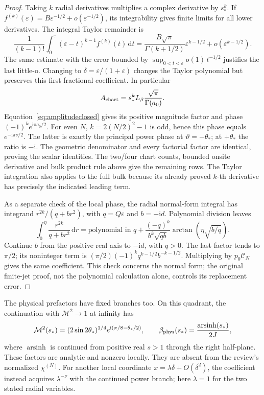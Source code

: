 \documentclass[11pt]{article}
\numberwithin{equation}{section}
\theoremstyle{definition}
\newcommand{\dd}{\,\mathrm d}
\newcommand{\ii}{\mathrm i}
\newcommand{\eps}{\varepsilon}
\newcommand{\M}{\mathcal M}
\begin{document}
\begin{proof}
Taking \(k\) radial derivatives multiplies a complex derivative by
\(s_*^k\). If \(f^{(k)}(\eps)=B\eps^{-1/2}+o(\eps^{-1/2})\),
its integrability gives finite limits for all lower derivatives.
The integral Taylor remainder is
\[
 \frac1{(k-1)!}\int_0^\eps(\eps-t)^{k-1}f^{(k)}(t)\dd t
 =\frac{B\sqrt\pi}{\Gamma(k+1/2)}\eps^{k-1/2}
       +o(\eps^{k-1/2}).
\]
The same estimate with the error bounded by
\(\sup_{0<t<\eps}o(1)\,t^{-1/2}\) justifies the last little-o.
Changing to \(\delta=\eps/(1+\eps)\) changes the Taylor polynomial
but preserves this first fractional coefficient. In particular
\[
 A_{\rm chart}=s_*^kL_\beta\frac{\sqrt\pi}{\Gamma(a_0)}.
\]
Equation~\eqref{eq:amplitudeclosed} gives its positive magnitude
factor and phase \((-1)^ke^{\ii\pi a_0/2}\).
For even \(N\), \(k=2(N/2)^2-1\) is odd, hence this phase equals
\(e^{-\ii\pi\nu/2}\). The latter is exactly the principal power
phase at \(\vartheta=-\theta_*\); at \(+\theta_*\) the ratio is
\(-\ii\). The geometric denominator and every factorial factor
are identical, proving the scalar identities.
The two/four chart counts, bounded onsite derivative and bulk
product rule above give the remaining rows. The Taylor integration
also applies to the full bulk because its already proved \(k\)-th
derivative has precisely the indicated leading term.

As a separate check of the local phase, the radial normal-form
integral has integrand \(r^{2k}/(q+b r^2)\), with \(q=Q\eps\)
and \(b=-\ii d\). Polynomial division leaves
\[
 \int_0^\eta\frac{r^{2k}}{q+b r^2}\dd r
 =\text{polynomial in }q+
 \frac{(-q)^k}{b^k\sqrt{qb}}
             \arctan\!\left(\eta\sqrt{b/q}\right).
\]
Continue \(b\) from the positive real axis to \(-\ii d\), with
\(q>0\). The last factor tends to \(\pi/2\); its noninteger term
is \((\pi/2)(-1)^kq^{k-1/2}b^{-k-1/2}\).
Multiplying by \(p_0\mathscr C_N\) gives the same coefficient.
This check concerns the normal form; the original finite-jet proof,
not the polynomial calculation alone, controls its replacement error.
\end{proof}

The physical prefactors have fixed branches too. On this quadrant,
the continuation with \(\M^2\to1\) at infinity has
\[
 \M^2(s_*)=(2\sin2\theta_*)^{1/4}
             e^{\ii(\pi/8-\theta_*/2)},\qquad
 \beta_{\rm phys}(s_*)=\frac{\operatorname{arsinh}(s_*)}{2J},
\]
where \(\operatorname{arsinh}\) is continued from positive real
\(s>1\) through the right half-plane. These factors are analytic
and nonzero locally. They are absent from the review's normalized
\(\chi^{(N)}\). For another local coordinate
\(x=\lambda\delta+O(\delta^2)\), the coefficient instead acquires
\(\lambda^{-\nu}\) with the continued power branch; here
\(\lambda=1\) for the two stated radial variables.
\end{document}
